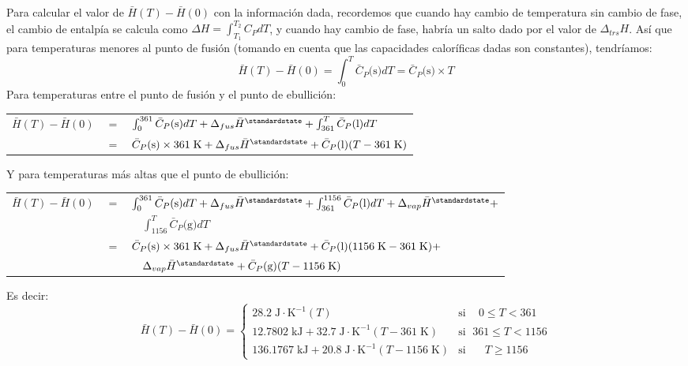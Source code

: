\documentclass[a4paper,12pt]{article}
\begin{document}
\begin{enumerate}
Para calcular el valor de $\bar{H}(T)-\bar{H}(0)$ con la informaci\'on dada, recordemos que cuando hay cambio de temperatura sin cambio de fase, el cambio de entalp\'ia se calcula como $\Delta H=\int_{T_1}^{T_2}C_PdT$, y cuando hay cambio de fase, habr\'ia un salto dado por el valor de $\Delta_{trs} H$. As\'i que para temperaturas menores al punto de fusi\'on (tomando en cuenta que las capacidades calor\'ificas dadas son constantes), tendr\'iamos:
$$\bar{H}(T)-\bar{H}(0)=\int_{0}^{T}\bar{C}_P\mbox{(s)}dT=\bar{C}_P\mbox{(s)}\times T$$
Para temperaturas entre el punto de fusi\'on y el punto de ebullici\'on:

\begin{tabular}{r c l}
$\bar{H}(T)-\bar{H}(0)$ & $=$ & $\int_{0}^{361}\bar{C}_P\mbox{(s)}dT+\Delta_{fus}\bar{H}^\standardstate+\int_{361}^{T}\bar{C}_P\mbox{(l)}dT$ \\
& $=$ & $\bar{C}_P\mbox{(s)}\times 361\;\mbox{K}+\Delta_{fus}\bar{H}^\standardstate+\bar{C}_P\mbox{(l)}(T-361\;\mbox{K})$
\end{tabular}

Y para temperaturas m\'as altas que el punto de ebullici\'on:

\begin{tabular}{r c l}
$\bar{H}(T)-\bar{H}(0)$ & $=$ & $\int_{0}^{361}\bar{C}_P\mbox{(s)}dT+\Delta_{fus}\bar{H}^\standardstate+\int_{361}^{1156}\bar{C}_P\mbox{(l)}dT+\Delta_{vap}\bar{H}^\standardstate+$ \\
& & $\quad\int_{1156}^{T}\bar{C}_P\mbox{(g)}dT$ \\
& $=$ & $\bar{C}_P\mbox{(s)}\times 361\;\mbox{K}+\Delta_{fus}\bar{H}^\standardstate+\bar{C}_P\mbox{(l)}(1156\;\mbox{K}-361\;\mbox{K})+$ \\
& & $\quad\Delta_{vap}\bar{H}^\standardstate+\bar{C}_P\mbox{(g)}(T-1156\;\mbox{K})$
\end{tabular}

Es decir:
\[
 \bar{H}(T)-\bar{H}(0) =
  \begin{cases}
  28.2\;\mbox{J}\cdot\mbox{K}^{-1} (T) & \text{si }\;\;\; 0 \leq T < 361 \\
  12.7802\;\mbox{kJ}+32.7\;\mbox{J}\cdot\mbox{K}^{-1} (T-361\;\mbox{K})  & \text{si }\; 361 \leq T < 1156 \\
  136.1767\;\mbox{kJ}+20.8\;\mbox{J}\cdot\mbox{K}^{-1} (T-1156\;\mbox{K}) & \text{si }\;\;\;\;\; T \geq 1156
  \end{cases}
\]


\end{enumerate}
\end{document}
